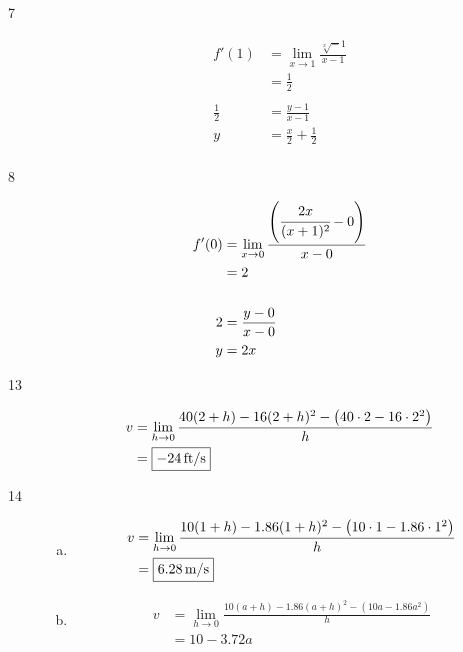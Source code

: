 \documentclass[letterpaper, landscape]{exam}
\begin{document}
\begin{description}
      \item[7]
        \begin{align*}
          f'(1)       & = \lim_{x \to 1} \frac{ \sqrt[x] - 1 }{x - 1} \\
                      & = \frac{1}{2} \\
          \\
          \frac{1}{2} & = \frac{y - 1}{x - 1} \\
          y           & = \frac{x}{2} + \frac{1}{2} \\
        \end{align*}

      \item[8]
        \begin{align*}
          f'(0) & = \lim_{x \to 0} \frac{ \left( \cfrac{2x}{(x + 1)^2} - 0 \right) }{x - 0} \\
                & = 2 \\
          \\
          2     & = \frac{y - 0}{x - 0} \\
          y     & = 2x \\
        \end{align*}
      
      \item[13]
        \begin{align*}
          v & = \lim_{h \to 0} \frac{ 40(2 + h) - 16 (2 + h)^2 - \left( 40 \cdot 2 - 16 \cdot 2^2 \right)}{h} \\
            & = \boxed{ \unit[-24]{ft/s} }
        \end{align*}

      \item[14]
        \begin{enumerate}[(a)]
          \item 
            \begin{align*}
              v & = \lim_{h \to 0} \frac{ 10(1 + h) - 1.86 (1 + h)^2 - \left( 10 \cdot 1 - 1.86 \cdot 1^2 \right) }{h} \\
                & = \boxed{ \unit[6.28]{m/s} }
            \end{align*}

          \item
            \begin{align*}
              v & = \lim_{h \to 0} \frac{ 10(a + h) - 1.86 (a + h)^2 - \left( 10 a - 1.86 a^2 \right) }{h} \\
                & = \boxed{ 10 - 3.72a }
            \end{align*}


\end{enumerate}
\end{description}
\end{document}
